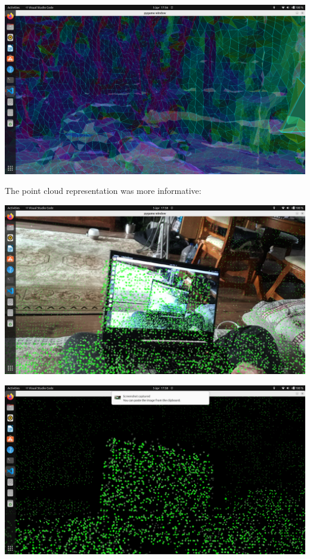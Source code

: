 \documentclass{article}
\begin{document}
\begin{itemize}
\begin{minipage}{\linewidth}
    \end{minipage}
    \par
    \begin{minipage}{\linewidth}
        \centering
        \includegraphics[width=1\linewidth]{spectacular_ai_mapping_ar_mesh2.png}
    \end{minipage}
    \par
    The point cloud representation was more informative:\par
    \begin{minipage}{\linewidth}
        \centering
        \includegraphics[width=1\linewidth]{spectacular_ai_mapping_ar_pc1.png}
    \end{minipage}
    \par
    \begin{minipage}{\linewidth}
        \centering
        \includegraphics[width=1\linewidth]{spectacular_ai_mapping_ar_pc2.png}

\end{minipage}
\end{itemize}
\end{document}
